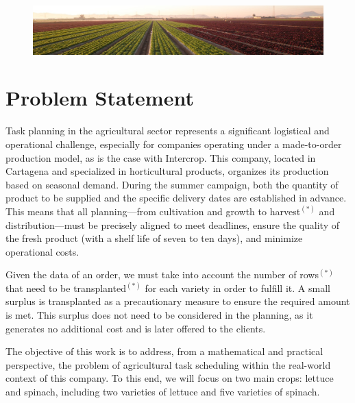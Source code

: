 \vspace{10mm}
\begin{figure}[ht!]
    \centering
    \includegraphics[width=1\textwidth]{img/campitos_lindos.jpeg}
    \label{fig:campitos_lindos}
\end{figure}

\chapter*{Problem Statement}

Task planning in the agricultural sector represents a significant logistical and operational challenge,  
especially for companies operating under a made-to-order production model, as is the case with Intercrop.  
This company, located in Cartagena and specialized in horticultural products, organizes its production based on seasonal demand.  
During the summer campaign, both the quantity of product to be supplied and the specific delivery dates are established in advance.  
This means that all planning—from cultivation and growth to \gls{harvest}$^{(*)}$ and distribution—must be precisely aligned to meet deadlines,  
ensure the quality of the fresh product (with a shelf life of seven to ten days), and minimize operational costs.

Given the data of an order, we must take into account the number of \gls{row}s$^{(*)}$ that need to be \gls{transplanted}$^{(*)}$ for each variety in order to fulfill it.  
A small surplus is transplanted as a precautionary measure to ensure the required amount is met.  
This surplus does not need to be considered in the planning, as it generates no additional cost and is later offered to the clients.
 

The objective of this work is to address, from a mathematical and practical perspective, the problem of agricultural task scheduling within the real-world context of this company.  
To this end, we will focus on two main crops: lettuce and spinach, including two varieties of lettuce and five varieties of spinach.

